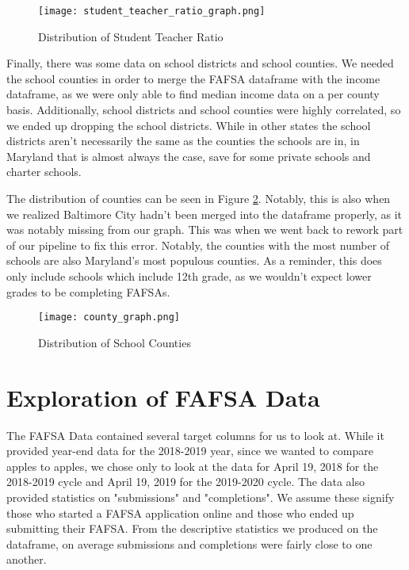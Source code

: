 \documentclass[12pt]{article}
\begin{document}
\begin{figure}[!htb]
  \centering
  \texttt{[image: student\_teacher\_ratio\_graph.png]}
  \caption{Distribution of Student Teacher Ratio}
  \label{fig:student_teacher_ratio}
\end{figure}

Finally, there was some data on school districts and school counties. We needed the
school counties in order to merge the FAFSA dataframe with the income dataframe, as
we were only able to find median income data on a per county basis. Additionally,
school districts and school counties were highly correlated, so we ended up dropping
the school districts. While in other states the school districts aren't necessarily
the same as the counties the schools are in, in Maryland that is almost always the
case, save for some private schools and charter schools.

The distribution of counties can be seen in Figure \ref{fig:county}. Notably, this is
also when we realized Baltimore City hadn't been merged into the dataframe properly,
as it was notably missing from our graph. This was when we went back to rework part
of our pipeline to fix this error. Notably, the counties with the most number of 
schools are also Maryland's most populous counties. As a reminder, this does only
include schools which include 12th grade, as we wouldn't expect lower grades to
be completing FAFSAs.\\

\begin{figure}[!htb]
  \centering
  \texttt{[image: county\_graph.png]}
  \caption{Distribution of School Counties}
  \label{fig:county}
\end{figure}

\section{Exploration of FAFSA Data}

The FAFSA Data contained several target columns for us to look at. While it 
provided year-end data for the 2018-2019 year, since we wanted to compare
apples to apples, we chose only to look at the data for April 19, 2018 for the
2018-2019 cycle and April 19, 2019 for the 2019-2020 cycle. The data also provided
statistics on "submissions" and "completions". We assume these signify those who
started a FAFSA application online and those who ended up submitting their FAFSA.
From the descriptive statistics we produced on the dataframe, on average 
submissions and completions were fairly close to one another.\\
\end{document}
